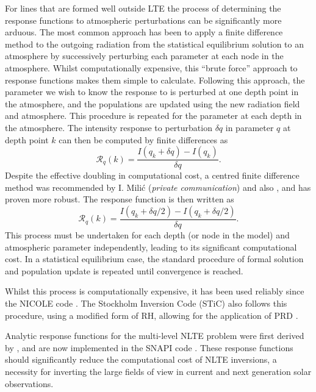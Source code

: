 For lines that are formed well outside LTE the process of determining the response functions to atmospheric perturbations can be significantly more arduous.
The most common approach has been to apply a finite difference method to the outgoing radiation from the statistical equilibrium solution to an atmosphere by successively perturbing each parameter at each node in the atmosphere.
Whilst computationally expensive, this ``brute force'' approach to response functions makes them simple to calculate.
Following this approach, the parameter we wish to know the response to is perturbed at one depth point in the atmosphere, and the populations are updated using the new radiation field and atmosphere.
This procedure is repeated for the parameter at each depth in the atmosphere.
The intensity response to perturbation $\delta q$ in parameter $q$ at depth point $k$ can then be computed by finite differences as
\begin{equation}
    \mathcal{R}_q(k) = \frac{I(q_k + \delta q) - I(q_k)}{\delta q}.
\end{equation}
Despite the effective doubling in computational cost, a centred finite difference method was recommended by I. Mili\'{c} (\emph{private communication}) and also \citet{DelaCruzRodriguez2017}, and has proven more robust.
The response function is then written as
\begin{equation}
    \mathcal{R}_q(k) = \frac{I(q_k + \delta q / 2) - I(q_k + \delta q / 2)}{\delta q}.
\end{equation}
This process must be undertaken for each depth (or node in the model) and atmospheric parameter independently, leading to its significant computational cost.
In a statistical equilibrium case, the standard procedure of formal solution and population update is repeated until convergence is reached.

Whilst this process is computationally expensive, it has been used reliably since the NICOLE code \citep[developed from \citet{SocasNavarro2000} but no longer using fixed departure coefficients]{Socas-Navarro2015}.
The Stockholm Inversion Code (STiC) also follows this procedure, using a modified form of RH, allowing for the application of PRD \citep{2019dlcr}.

Analytic response functions for the multi-level NLTE problem were first derived by \citet{Milic2017}, and are now implemented in the SNAPI code \citep{Milic2018}.
These response functions should significantly reduce the computational cost of NLTE inversions, a necessity for inverting the large fields of view in current and next generation solar observations.


